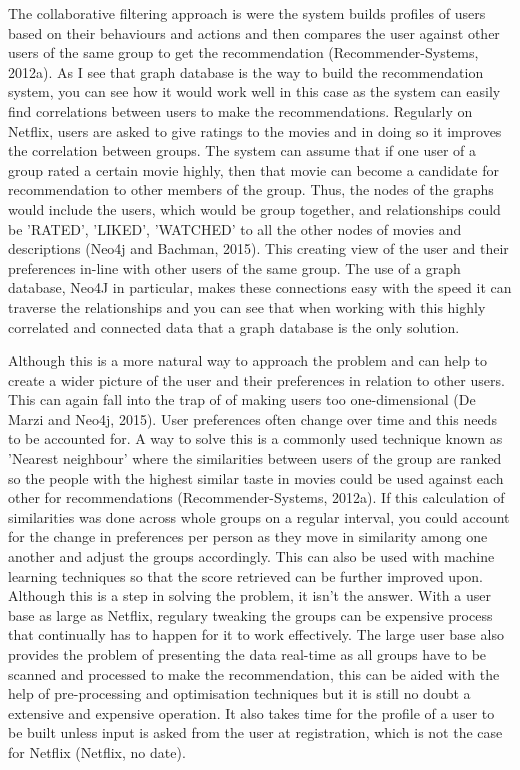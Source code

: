 \documentclass[a4paper]{article}
\begin{document}
The collaborative filtering approach is were the system builds profiles of users based on their behaviours and actions and then compares the user against other users of the same group to get the recommendation (Recommender-Systems, 2012a). As I see that graph database is the way to build the recommendation system, you can see how it would work well in this case as the system can easily find correlations between users to make the recommendations. Regularly on Netflix, users are asked to give ratings to the movies and in doing so it improves the correlation between groups. The system can assume that if one user of a group rated a certain movie highly, then that movie can become a candidate for recommendation to other members of the group. Thus, the nodes of the graphs would include the users, which would be group together, and relationships could be 'RATED', 'LIKED', 'WATCHED' to all the other nodes of movies and descriptions (Neo4j and Bachman, 2015). This creating view of the user and their preferences in-line with other users of the same group. The use of a graph database, Neo4J in particular, makes these connections easy with the speed it can traverse the relationships and you can see that when working with this highly correlated and connected data that a graph database is the only solution. \par

Although this is a more natural way to approach the problem and can help to create a wider picture of the user and their preferences in relation to other users. This can again fall into the trap of of making users too one-dimensional (De Marzi and Neo4j, 2015). User preferences often change over time and this needs to be accounted for. A way to solve this is a commonly used technique known as 'Nearest neighbour' where the similarities between users of the group are ranked so the people with the highest similar taste in movies could be used against each other for recommendations (Recommender-Systems, 2012a). If this calculation of similarities was done across whole groups on a regular interval, you could account for the change in preferences per person as they move in similarity among one another and adjust the groups accordingly. This can also be used with machine learning techniques so that the score retrieved can be further improved upon. Although this is a step in solving the problem, it isn't the answer. With a user base as large as Netflix, regulary tweaking the groups can be expensive process that continually has to happen for it to work effectively. The large user base also provides the problem of presenting the data real-time as all groups have to be scanned and processed to make the recommendation, this can be aided with the help of pre-processing and optimisation techniques but it is still no doubt a extensive and expensive operation. It also takes time for the profile of a user to be built unless input is asked from the user at registration, which is not the case for Netflix (Netflix, no date).
\end{document}
